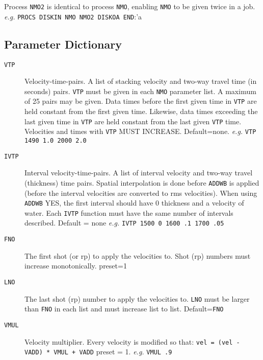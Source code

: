      Process \texttt{NMO2} is identical to process \texttt{NMO}, enabling \texttt{NMO} to be given
twice in a job.  \textit{e.g.}  \texttt{PROCS DISKIN NMO NMO2 DISKOA END}:'a

\subsection{Parameter Dictionary}

\begin{description}
\item[\texttt{VTP}] Velocity-time-pairs.  A list of stacking velocity and two-way
         travel time (in seconds) pairs.  \texttt{VTP} must be given in each \texttt{NMO}
         parameter list.  A maximum of 25 pairs may be given.  Data
         times before the first given time in \texttt{VTP} are held constant from
         the first given time.  Likewise, data times exceeding the last
         given time in \texttt{VTP} are held constant from the last given \texttt{VTP}
         time.  Velocities and times with \texttt{VTP} MUST INCREASE.
         Default=none.  \textit{e.g.} \texttt{VTP 1490 1.0 2000 2.0}

\item[\texttt{IVTP}] Interval velocity-time-pairs.  A list of interval velocity
         and two-way travel (thickness) time pairs.  Spatial
         interpolation is done before \texttt{ADDWB} is applied (before the
         interval velocities are converted to rms velocities).  When
         using \texttt{ADDWB} YES, the first interval should have 0 thickness and
         a velocity of water.  Each \texttt{IVTP} function must have the same
         number of intervals described.
         Default = none   \textit{e.g.}    \texttt{IVTP  1500 0 1600 .1 1700 .05}

\item[\texttt{FNO}] The first \gls{shot} (or \gls{rp}) to apply the velocities to.  Shot (\gls{rp})
         numbers must increase monotonically.
         \Gls{preset}=1

\item[\texttt{LNO}] The last \gls{shot} (\gls{rp}) number to apply the velocities to.  \texttt{LNO} must
         be larger than \texttt{FNO} in each list and must increase list to list.
         Default=\texttt{FNO}

\item[\texttt{VMUL}] Velocity multiplier.  Every velocity is modified so that:
         \texttt{vel = (vel - VADD) * VMUL + VADD}
         \Gls{preset} = 1.    \textit{e.g.}  \texttt{VMUL .9}


\end{description}
